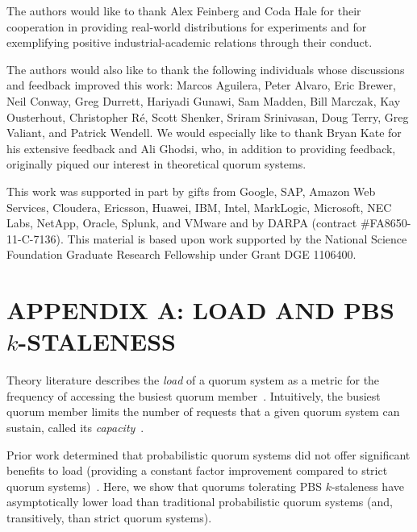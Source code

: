 \documentclass{vldb}
\newcommand{\sectionskip}{-0em}
\begin{document}
The authors would like to thank Alex Feinberg and Coda Hale for their
cooperation in providing real-world distributions for experiments and for
exemplifying positive industrial-academic relations through their conduct.

The authors would also like to thank the following individuals whose
discussions and feedback improved this work: Marcos Aguilera, Peter
Alvaro, Eric Brewer, Neil Conway, Greg Durrett, Hariyadi Gunawi, Sam
Madden, Bill Marczak, Kay Ousterhout, Christopher R\'e, Scott Shenker,
Sriram Srinivasan, Doug Terry, Greg Valiant, and Patrick Wendell.  We
would especially like to thank Bryan Kate for his extensive feedback
and Ali Ghodsi, who, in addition to providing feedback, originally
piqued our interest in theoretical quorum systems.

This work was supported in part by gifts from Google, SAP,
Amazon Web Services, Cloudera, Ericsson, Huawei, IBM, Intel,
MarkLogic, Microsoft, NEC Labs, NetApp, Oracle, Splunk, and VMware and
by DARPA (contract \#FA8650-11-C-7136).  This material is based upon
work supported by the National Science Foundation Graduate Research
Fellowship under Grant DGE 1106400.

{\small


}

\balance


\vspace{\sectionskip}
\section*{APPENDIX A: LOAD AND PBS {\large$k$}-STALENESS}
Theory literature describes the \textit{load} of a quorum system as a
metric for the frequency of accessing the busiest quorum
member~\cite[Definition 3.2]{quorumsystems}.  Intuitively, the busiest
quorum member limits the number of requests that a given quorum system
can sustain, called its \textit{capacity}~\cite[Corollary
  3.9]{quorumsystems}.

Prior work determined that probabilistic quorum systems did not offer
significant benefits to load (providing a constant factor improvement
compared to strict quorum systems)~\cite{prob-quorum}.  Here, we show
that quorums tolerating PBS $k$-staleness have asymptotically lower
load than traditional probabilistic quorum systems (and, transitively,
than strict quorum systems).
\end{document}
